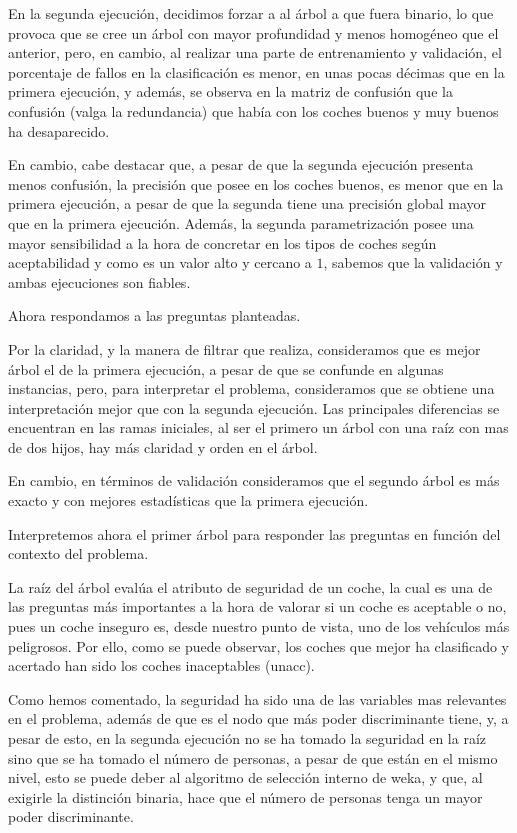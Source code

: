 \documentclass[a4paper, 11pt, twoside, openany, onecolumn, final]{memoir}
\begin{document}
	En la segunda ejecución, decidimos forzar a al árbol a que fuera binario, lo que provoca que se cree un  árbol con mayor profundidad y menos homogéneo que el anterior, pero, en cambio, al realizar una parte de entrenamiento y validación, el porcentaje de fallos en la clasificación es menor, en unas pocas décimas que en la primera ejecución, y además, se observa en la matriz de confusión que la confusión (valga la redundancia) que había con los coches buenos y muy buenos ha desaparecido. 
	
	En cambio, cabe destacar que, a pesar de que la segunda ejecución presenta menos confusión, la precisión que posee en los coches buenos, es menor que en la primera ejecución, a pesar de que la segunda tiene una precisión global mayor que en la primera ejecución. Además, la segunda parametrización posee una mayor sensibilidad a la hora de concretar en los tipos de coches según aceptabilidad y como es un valor alto y cercano a $1$, sabemos que la validación y ambas ejecuciones son fiables.
	
	Ahora respondamos a las preguntas planteadas.
	
	Por la claridad, y la manera de filtrar que realiza, consideramos que es mejor árbol el de la primera ejecución, a pesar de que se confunde en algunas instancias, pero, para interpretar el problema, consideramos que se obtiene una interpretación mejor que con la segunda ejecución. Las principales diferencias se encuentran en las ramas iniciales, al ser el primero un árbol con una raíz con mas de dos hijos, hay más claridad y orden en el árbol. 
	
	En cambio, en términos de validación consideramos que el segundo árbol es más exacto y con mejores estadísticas que la primera ejecución.
	
	Interpretemos ahora el primer árbol para responder las preguntas en función del contexto del problema.
	
	La raíz del árbol evalúa el atributo de seguridad de un coche, la cual es una de las preguntas más importantes a la hora de valorar si un coche es aceptable o no, pues un coche inseguro es, desde nuestro punto de vista, uno de los vehículos más peligrosos. Por ello, como se puede observar, los coches que mejor ha clasificado y acertado han sido los coches inaceptables (unacc).
	
	Como hemos comentado, la seguridad ha sido una de las variables mas relevantes en el problema, además de que es el nodo que más poder discriminante tiene, y, a pesar de esto, en la segunda ejecución no se ha tomado la seguridad en la raíz sino que se ha tomado el número de personas, a pesar de que están en el mismo nivel, esto se puede deber al algoritmo de selección interno de weka, y que, al exigirle la distinción binaria, hace que el número de personas tenga un mayor poder discriminante.   
	
\end{document}
